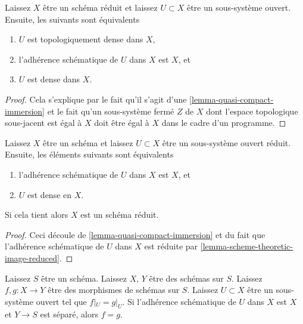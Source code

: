 \begin{lemma}

\label{lemma-reduced-scheme-theoretically-dense}
Laissez $X$ être un schéma réduit et laissez $U \subset X$ être un sous-système ouvert. Ensuite, les suivants sont équivalents
\begin{enumerate}
\item $U$ est topologiquement dense dans $X$,
\item l'adhérence schématique de $U$ dans $X$ est $X$, et
\item $U$ est dense dans $X$.
\end{enumerate}

\end{lemma}

\begin{proof}

Cela s'explique par le fait qu'il s'agit d'une \ref{lemma-quasi-compact-immersion}
et le fait qu'un sous-système fermé $Z$ de $X$ dont l'espace topologique sous-jacent est égal à $X$ doit être égal à $X$
dans le cadre d'un programme.

\end{proof}

\begin{lemma}

\label{lemma-reduced-subscheme-closure}
Laissez $X$ être un schéma et laissez $U \subset X$ être un sous-système ouvert réduit. Ensuite, les éléments suivants sont équivalents
\begin{enumerate}
\item l'adhérence schématique de $U$ dans $X$ est $X$, et
\item $U$ est dense en $X$.
\end{enumerate}
Si cela tient alors $X$ est un schéma réduit.
\end{lemma}

\begin{proof}
Ceci découle de \ref{lemma-quasi-compact-immersion} et du fait que l'adhérence schématique de $U$ dans $X$ est réduite par \ref{lemma-scheme-theoretic-image-reduced}.
\end{proof}

\begin{lemma}

\label{lemma-equality-of-morphisms}
Laissez $S$ être un schéma. Laissez $X$, $Y$ être des schémas sur $S$. Laissez $f, g : X \to Y$ être des morphismes de schémas sur $S$. Laissez $U \subset X$ être un sous-système ouvert tel que $f|_U = g|_U$. Si l'adhérence schématique de $U$ dans $X$ est $X$ et $Y \to S$ est séparé, alors $f = g$.
\end{lemma}

